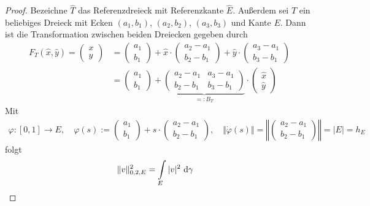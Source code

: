 \begin{proof}
	Bezeichne $\hat{T}$ das Referenzdreieck mit Referenzkante $\hat{E}$. Außerdem sei $T$ ein beliebiges Dreieck mit Ecken $(a_1,b_1)$, $(a_2,b_2)$, $(a_3,b_3)$ und Kante $E$.
	Dann ist die Transformation zwischen beiden Dreiecken gegeben durch
	\begin{align*}
		F_T(\hat{x},\hat{y})=\begin{pmatrix}
			x\\y
		\end{pmatrix}
		&=\begin{pmatrix}
			a_1\\ b_1
		\end{pmatrix}
		+\hat{x}\cdot\begin{pmatrix}
			a_2-a_1\\ b_2-b_1
		\end{pmatrix}+
		\hat{y}\cdot\begin{pmatrix}
			a_3-a_1\\ b_3-b_1
		\end{pmatrix}\\
		&=\begin{pmatrix}
			a_1\\ b_1
		\end{pmatrix}
		+\underbrace{\begin{pmatrix}
			a_2-a_1 & a_3-a_1\\
			b_2-b_1 & b_3-b_1
		\end{pmatrix}}_{=:B_T}\cdot\begin{pmatrix}
			\hat{x}\\ \hat{y}
		\end{pmatrix}
	\end{align*}
	Mit
	\begin{align*}
		\varphi\colon[0,1]\to E,\quad\varphi(s):=\begin{pmatrix}
		a_1\\ b_1
		\end{pmatrix}+s\cdot\begin{pmatrix}
		a_2-a_1\\
		b_2-b_1
		\end{pmatrix},\quad
		\big\Vert\dot\varphi(s)\big\Vert=\left\Vert\begin{pmatrix}
		a_2-a_1\\
		b_2-b_1
		\end{pmatrix}\right\Vert=|E|=h_E
	\end{align*}
	folgt
	\begin{align*}
		&\Vert v\Vert_{0,2,E}^2
		=\int\limits_E|v|^2\d\gamma

\end{align*}
\end{proof}

